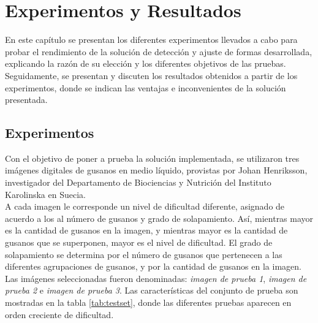 \thispagestyle{empty}
\cleardoublepage
\chapter{Experimentos y Resultados}
\label{chap:experiments}


En este cap\'itulo se presentan los diferentes experimentos llevados a cabo
para probar el rendimiento de la soluci\'on de detecci\'on y ajuste de formas
desarrollada, explicando la raz\'on de su elecci\'on y los diferentes objetivos
de las pruebas. Seguidamente, se presentan y discuten los resultados obtenidos a
partir de los experimentos, donde se indican las ventajas e inconvenientes 
de la soluci\'on presentada.

\section{Experimentos}
\label{sec:experiments}

Con el objetivo de poner a prueba la soluci\'on implementada, se utilizaron tres im\'agenes
digitales de gusanos en medio l\'iquido, provistas por Johan Henriksson, investigador del
Departamento de Biociencias y Nutrici\'on del Instituto Karolinska en Suecia.\\

A cada imagen le corresponde un nivel de dificultad diferente, asignado de acuerdo a los
al n\'umero de gusanos y grado de solapamiento. As\'i, mientras mayor es la cantidad
de gusanos en la imagen, y mientras mayor es la cantidad de gusanos que se superponen, 
mayor es el nivel de dificultad. El grado de solapamiento se determina por el n\'umero
de gusanos que pertenecen a las diferentes agrupaciones de gusanos, y por la cantidad
de gusanos en la imagen.\\

Las im\'agenes seleccionadas fueron denominadas: \emph{imagen de prueba 1}, \emph{imagen de prueba 2} e
\emph{imagen de prueba 3}. Las caracter\'isticas del conjunto de prueba son mostradas en la tabla \ref{tab:testset}, donde
las diferentes pruebas aparecen en orden creciente de dificultad.


